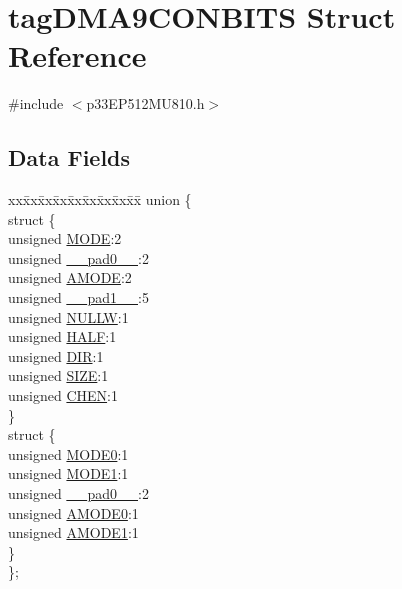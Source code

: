 \hypertarget{structtag_d_m_a9_c_o_n_b_i_t_s}{}\section{tag\+D\+M\+A9\+C\+O\+N\+B\+I\+TS Struct Reference}
\label{structtag_d_m_a9_c_o_n_b_i_t_s}


{\ttfamily \#include $<$p33\+E\+P512\+M\+U810.\+h$>$}

\subsection*{Data Fields}
\begin{DoxyCompactItemize}
\item 
\begin{tabbing}
xx\=xx\=xx\=xx\=xx\=xx\=xx\=xx\=xx\=\kill
union \{\\
\>struct \{\\
\>\>unsigned \hyperlink{structtag_d_m_a9_c_o_n_b_i_t_s_adc56ba18ff3f1599c85d222bee624424}{MODE}:2\\
\>\>unsigned \hyperlink{structtag_d_m_a9_c_o_n_b_i_t_s_adf71f3d8410c1f1dbbc96680a92c49af}{\_\_pad0\_\_}:2\\
\>\>unsigned \hyperlink{structtag_d_m_a9_c_o_n_b_i_t_s_ab3ff4e1f1b9a1037418ca7b6cb2e8f77}{AMODE}:2\\
\>\>unsigned \hyperlink{structtag_d_m_a9_c_o_n_b_i_t_s_acaf2d0924a107ec6e8d2e31febaf66f9}{\_\_pad1\_\_}:5\\
\>\>unsigned \hyperlink{structtag_d_m_a9_c_o_n_b_i_t_s_a1d3f7d04416314131889d1671a9287ad}{NULLW}:1\\
\>\>unsigned \hyperlink{structtag_d_m_a9_c_o_n_b_i_t_s_a1a715a64b2576f59401ac93d6f9a086a}{HALF}:1\\
\>\>unsigned \hyperlink{structtag_d_m_a9_c_o_n_b_i_t_s_ad6868749602045a76f36ffdf964dfd39}{DIR}:1\\
\>\>unsigned \hyperlink{structtag_d_m_a9_c_o_n_b_i_t_s_a5863cac6dc2cb330bdd0b1c66da70ffe}{SIZE}:1\\
\>\>unsigned \hyperlink{structtag_d_m_a9_c_o_n_b_i_t_s_a092934036fdfb8df5259db288fe438ca}{CHEN}:1\\
\>\} \\
\>struct \{\\
\>\>unsigned \hyperlink{structtag_d_m_a9_c_o_n_b_i_t_s_abc938903e74bff48935569d0c5b19035}{MODE0}:1\\
\>\>unsigned \hyperlink{structtag_d_m_a9_c_o_n_b_i_t_s_a7a9f7514566d0626724ce6c4b81b5ea2}{MODE1}:1\\
\>\>unsigned \hyperlink{structtag_d_m_a9_c_o_n_b_i_t_s_adf71f3d8410c1f1dbbc96680a92c49af}{\_\_pad0\_\_}:2\\
\>\>unsigned \hyperlink{structtag_d_m_a9_c_o_n_b_i_t_s_a0a1f894a2695c1388a5412244636805b}{AMODE0}:1\\
\>\>unsigned \hyperlink{structtag_d_m_a9_c_o_n_b_i_t_s_a3fde4abc0dc3db6fef6afc28c565ce3e}{AMODE1}:1\\
\>\} \\
\}; \\


\end{tabbing}
\end{DoxyCompactItemize}

